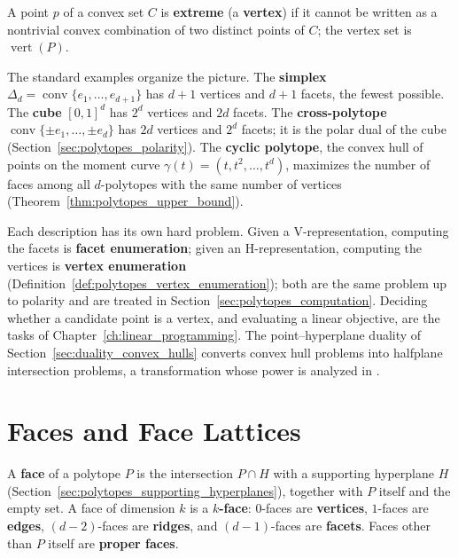 \begin{definition}\label{def:polytopes_vertex}
  A point $p$ of a convex set $C$ is \textbf{extreme} (a \textbf{vertex}) if
  it cannot be written as a nontrivial convex combination of two distinct
  points of $C$; the vertex set is $\operatorname{vert}(P)$.
\end{definition}

The standard examples organize the picture. The \textbf{simplex}
$\Delta_d = \operatorname{conv}\{e_1, \dots, e_{d+1}\}$ has $d+1$ vertices
and $d+1$ facets, the fewest possible. The \textbf{cube} $[0,1]^d$ has
$2^d$ vertices and $2d$ facets. The \textbf{cross-polytope}
$\operatorname{conv}\{\pm e_1, \dots, \pm e_d\}$ has $2d$ vertices and
$2^d$ facets; it is the polar dual of the cube
(Section~\ref{sec:polytopes_polarity}). The \textbf{cyclic polytope}, the
convex hull of points on the moment curve $\gamma(t) = (t, t^2, \dots,
t^d)$, maximizes the number of faces among all $d$-polytopes with the same
number of vertices (Theorem~\ref{thm:polytopes_upper_bound}).

Each description has its own hard problem. Given a V-representation,
computing the facets is \textbf{facet enumeration}; given an
H-representation, computing the vertices is \textbf{vertex enumeration}
(Definition~\ref{def:polytopes_vertex_enumeration}); both are the same
problem up to polarity and are treated in
Section~\ref{sec:polytopes_computation}. Deciding whether a candidate point
is a vertex, and evaluating a linear objective, are the tasks of
Chapter~\ref{ch:linear_programming}. The point--hyperplane duality of
Section~\ref{sec:duality_convex_hulls} converts convex hull problems into
halfplane intersection problems, a transformation whose power is analyzed in
\cite{chazelle1985power}.


\section{Faces and Face Lattices}
\label{sec:polytopes_faces}

\begin{definition}[Faces]\label{def:polytopes_face}
  A \textbf{face} of a polytope $P$ is the intersection $P \cap H$ with a
  supporting hyperplane $H$ (Section~\ref{sec:polytopes_supporting_hyperplanes}),
  together with $P$ itself and the empty set. A face of dimension $k$ is a
  \textbf{$k$-face}: $0$-faces are \textbf{vertices}, $1$-faces are
  \textbf{edges}, $(d-2)$-faces are \textbf{ridges}, and $(d-1)$-faces are
  \textbf{facets}. Faces other than $P$ itself are \textbf{proper faces}.
\end{definition}


